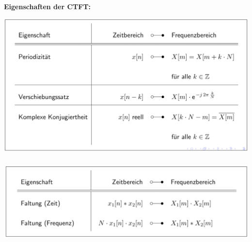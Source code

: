 \documentclass[12pt,a4paper]{scrartcl}
\begin{document}
  \noindent \textbf{Eigenschaften der CTFT:}\\
  \includegraphics[height = 8cm]{Pictures/EigenschaftenDFT.png}\\
  \includegraphics[height = 4.5cm]{Pictures/EigenschaftenDFT2.png}\\

  \newpage       
\end{document}
